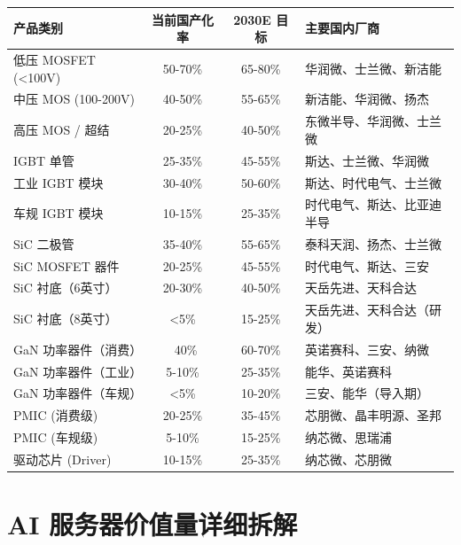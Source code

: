 \begin{exhibitbox}[表 A-3：各细分产品国产化率]
\centering
\small
\begin{tabularx}{\textwidth}{l c c X}
\toprule
\textbf{产品类别} & \textbf{当前国产化率} & \textbf{2030E 目标} & \textbf\textbf{主要国内厂商} \\
\midrule
低压 MOSFET (<100V) & 50-70\% & 65-80\% & 华润微、士兰微、新洁能 \\
中压 MOS (100-200V) & 40-50\% & 55-65\% & 新洁能、华润微、扬杰 \\
高压 MOS / 超结 & 20-25\% & 40-50\% & 东微半导、华润微、士兰微 \\
IGBT 单管 & 25-35\% & 45-55\% & 斯达、士兰微、华润微 \\
工业 IGBT 模块 & 30-40\% & 50-60\% & 斯达、时代电气、士兰微 \\
车规 IGBT 模块 & 10-15\% & 25-35\% & 时代电气、斯达、比亚迪半导 \\
\midrule
SiC 二极管 & 35-40\% & 55-65\% & 泰科天润、扬杰、士兰微 \\
SiC MOSFET 器件 & 20-25\% & 45-55\% & 时代电气、斯达、三安 \\
SiC 衬底（6英寸） & 20-30\% & 40-50\% & 天岳先进、天科合达 \\
SiC 衬底（8英寸） & <5\% & 15-25\% & 天岳先进、天科合达（研发） \\
\midrule
GaN 功率器件（消费） & ~40\% & 60-70\% & 英诺赛科、三安、纳微 \\
GaN 功率器件（工业） & 5-10\% & 25-35\% & 能华、英诺赛科 \\
GaN 功率器件（车规） & <5\% & 10-20\% & 三安、能华（导入期） \\
\midrule
PMIC (消费级) & 20-25\% & 35-45\% & 芯朋微、晶丰明源、圣邦 \\
PMIC (车规级) & 5-10\% & 15-25\% & 纳芯微、思瑞浦 \\
驱动芯片 (Driver) & 10-15\% & 25-35\% & 纳芯微、芯朋微 \\
\bottomrule
\end{tabularx}
\end{exhibitbox}

\section{AI 服务器价值量详细拆解}

